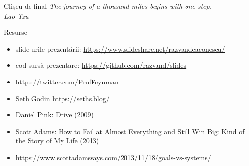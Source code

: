 \documentclass{simple}
\begin{document}
\begin{frame}{Clișeu de final}
  \centering
  \pause
  \textit{The journey of a thousand miles begins with one step.} \\
  \vspace{3mm}
  \hfill \textit{Lao Tzu} \\
\end{frame}

\begin{frame}{Resurse}
  \begin{itemize}
    \item slide-urile prezentării: \url{https://www.slideshare.net/razvandeaconescu/}
    \item cod sursă prezentare: \url{https://github.com/razvand/slides}
    \item \url{https://twitter.com/ProfFeynman}
    \item Seth Godin \url{https://seths.blog/}
    \item Daniel Pink: Drive (2009)
    \item Scott Adams: How to Fail at Almost Everything and Still Win Big: Kind of the Story of My Life (2013)
    \item \url{https://www.scottadamssays.com/2013/11/18/goals-vs-systems/}
  \end{itemize}
\end{frame}
\end{document}
